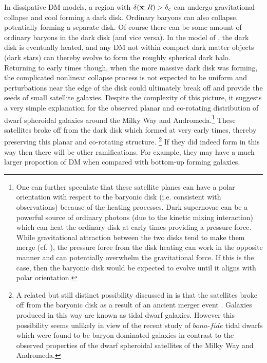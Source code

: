 \documentclass[12pt]{article}
\begin{document}
In dissipative DM models, a region with $\delta({\bf x};R) > \delta_c$ can undergo gravitational collapse and cool forming a dark disk. 
Ordinary baryons can also collapse, potentially forming a separate disk. Of course there can be some amount of ordinary baryons 
in the dark disk (and vice versa). In the model of \cite{sph,footexploredb,rich8}, the dark disk is eventually heated, and any DM not within 
compact dark matter objects (dark stars) can thereby evolve to form the roughly spherical dark halo. Returning to early times though, 
when the more massive dark disk was forming, the complicated nonlinear collapse process is not expected to be uniform and  perturbations 
near the edge of the disk could ultimately break off and provide the seeds of small satellite galaxies. Despite the complexity of this picture, 
it suggests a very simple explanation for the observed planar and co-rotating distribution of dwarf spheroidal galaxies around  
the Milky Way and Andromeda.\footnote{One can further speculate that these satellite planes can have a  polar 
orientation with respect to the baryonic disk (i.e. consistent with observations) because of the heating processes. Dark supernovae can be 
a powerful source of ordinary photons (due to the kinetic mixing interaction) which can heat the ordinary disk at early times providing 
a pressure force. While gravitational attraction between the two disks tend to make them merge (cf. \cite{rich6}), 
the pressure force from the disk heating can work in the opposite manner and can potentially  overwhelm the gravitational force. 
If this is the case, then the baryonic disk would be expected to evolve until it aligns with polar orientation.} 
%
These satellites broke off from 
the dark disk which formed at very early times, thereby preserving this planar and co-rotating structure. 
\footnote{A related but still distinct possibility discussed in \cite{thindisk,dddm6} is 
that the satellites broke off from the baryonic disk as a result of an ancient merger event \cite{hammer1,hammer2}. Galaxies produced in 
this way are known as tidal dwarf galaxies. However this possibility seems unlikely in view of the 
recent study of $bona$-$fide$ tidal dwarfs \cite{bf} which were found to be baryon dominated galaxies in contrast to the observed properties 
of the dwarf spheroidal satellites of the Milky Way and Andromeda.}
If they did indeed form in this way then there will be other ramifications.
For example, they may have  
a much larger proportion of DM when compared with bottom-up forming galaxies.
\end{document}

